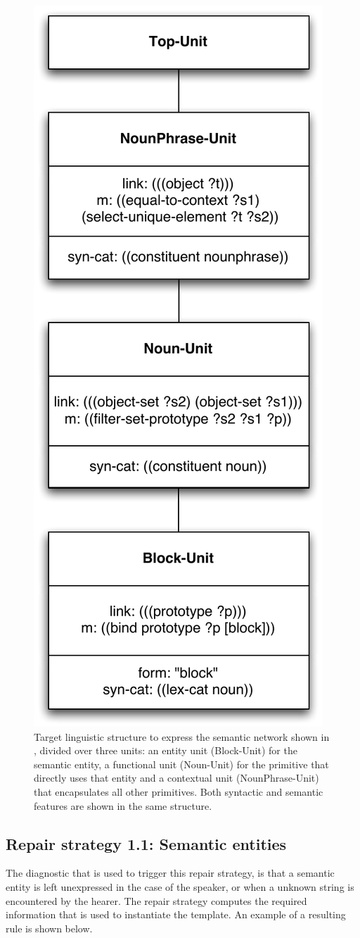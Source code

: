 \begin{figure}[htbp]
  \begin{center}
    \includegraphics[width=.4\textwidth]{./composition/figures/learning-1.pdf}
    \caption[First target linguistic structure to express semantic
    constraint network]{Target linguistic structure to express the semantic
      network shown in , divided over
      three units: an entity unit (Block-Unit) for the semantic
      entity, a functional unit (Noun-Unit) for the primitive that
      directly uses that entity and a contextual unit
      (NounPhrase-Unit) that encapsulates all other primitives. Both
      syntactic and semantic features are shown in the same
      structure.}
    \label{f:map-structure-1}
  \end{center}
\end{figure}

\subsection{Repair strategy 1.1: Semantic entities}

The diagnostic that is used to trigger this repair strategy, is that a
semantic entity is left unexpressed in the case of the speaker, or
when a unknown string is encountered by the hearer. The repair
strategy computes the required information that is used to instantiate
the template. An example of a resulting rule is shown below.

